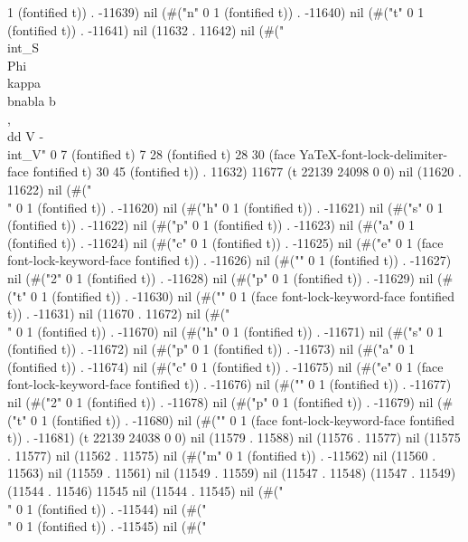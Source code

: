 1 (fontified t)) . -11639) nil (#("n" 0 1 (fontified t)) . -11640) nil (#("t" 0 1 (fontified t)) . -11641) nil (11632 . 11642) nil (#("\\int_S
 \\Phi\\kappa\\bnabla b \\, \\dd V - \\int_V" 0 7 (fontified t) 7 28 (fontified t) 28 30 (face YaTeX-font-lock-delimiter-face fontified t) 30 45 (fontified t)) . 11632) 11677 (t 22139 24098 0 0) nil (11620 . 11622) nil (#("\\" 0 1 (fontified t)) . -11620) nil (#("h" 0 1 (fontified t)) . -11621) nil (#("s" 0 1 (fontified t)) . -11622) nil (#("p" 0 1 (fontified t)) . -11623) nil (#("a" 0 1 (fontified t)) . -11624) nil (#("c" 0 1 (fontified t)) . -11625) nil (#("e" 0 1 (face font-lock-keyword-face fontified t)) . -11626) nil (#("{" 0 1 (fontified t)) . -11627) nil (#("2" 0 1 (fontified t)) . -11628) nil (#("p" 0 1 (fontified t)) . -11629) nil (#("t" 0 1 (fontified t)) . -11630) nil (#("}" 0 1 (face font-lock-keyword-face fontified t)) . -11631) nil (11670 . 11672) nil (#("\\" 0 1 (fontified t)) . -11670) nil (#("h" 0 1 (fontified t)) . -11671) nil (#("s" 0 1 (fontified t)) . -11672) nil (#("p" 0 1 (fontified t)) . -11673) nil (#("a" 0 1 (fontified t)) . -11674) nil (#("c" 0 1 (fontified t)) . -11675) nil (#("e" 0 1 (face font-lock-keyword-face fontified t)) . -11676) nil (#("{" 0 1 (fontified t)) . -11677) nil (#("2" 0 1 (fontified t)) . -11678) nil (#("p" 0 1 (fontified t)) . -11679) nil (#("t" 0 1 (fontified t)) . -11680) nil (#("}" 0 1 (face font-lock-keyword-face fontified t)) . -11681) (t 22139 24038 0 0) nil (11579 . 11588) nil (11576 . 11577) nil (11575 . 11577) nil (11562 . 11575) nil (#("m" 0 1 (fontified t)) . -11562) nil (11560 . 11563) nil (11559 . 11561) nil (11549 . 11559) nil (11547 . 11548) (11547 . 11549) (11544 . 11546) 11545 nil (11544 . 11545) nil (#("\\" 0 1 (fontified t)) . -11544) nil (#("\\" 0 1 (fontified t)) . -11545) nil (#("
